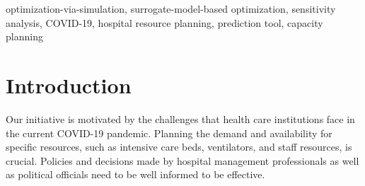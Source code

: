 \documentclass[conference]{IEEEtran}
\newcommand{\babsimhospital}{\textsc{BaBSim.Hospital}\xspace}
\begin{document}
\begin{abstract}
Crises like the COVID-19 pandemic pose a serious challenge to health-care institutions. They need to plan the resources required for handling the increased load, for instance, hospital beds and ventilators. To support the resource planning of local health authorities from the Cologne region, \babsimhospital, a tool for capacity planning based on discrete event simulation,  was created. The predictive quality of the simulation is determined by 29 parameters. Reasonable default values of these parameters were obtained in detailed discussions with medical professionals.  We aim to investigate and optimize these parameters to improve \babsimhospital. First approaches with "out-of-the-box" optimization algorithms failed. Implementing a surrogate-based optimization approach generated useful results in a reasonable time. 
The adaptation has been shown to reduce simulation errors by nearly 70\%

The presented approach is applicable to many other real-world problems, e.g., the development of new elevator systems to cover the last mile or simulation of student flow in academic study periods.
\end{abstract}

\begin{IEEEkeywords}
optimization-via-simulation, surrogate-model-based optimization, sensitivity analysis, COVID-19, hospital resource planning, prediction tool, capacity planning
\end{IEEEkeywords}


\section{Introduction}\label{sec:intro}
Our initiative is motivated by the challenges that health care institutions face in the current COVID-19 pandemic. 
Planning the demand and availability for specific resources, such as intensive care beds, ventilators, and staff resources, is crucial.
Policies and decisions made by hospital management professionals as well as political officials need to be well informed to be effective.
\end{document}
